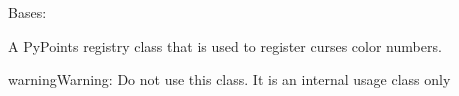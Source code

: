 \documentclass[letterpaper,10pt,english]{sphinxmanual}
\begin{document}
\begin{fulllineitems}
\label{\detokenize{pypoints:pypoints.ColorGet}}
Bases: 

A PyPoints registry class that is used to register curses color numbers.

\begin{sphinxadmonition}{warning}{Warning:}
Do not use this class. It is an internal usage class only
\end{sphinxadmonition}

\begin{fulllineitems}
\label{\detokenize{pypoints:pypoints.ColorGet.get}}
\end{fulllineitems}


\end{fulllineitems}

\end{document}
